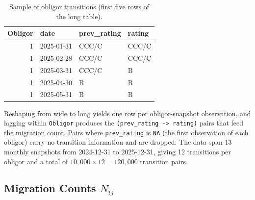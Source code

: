 \documentclass[
  11pt,
]{article}
\newenvironment{Shaded}{\begin{snugshade}}{\end{snugshade}}
\newcommand{\AttributeTok}[1]{\textcolor[rgb]{0.13,0.29,0.53}{#1}}
\newcommand{\FunctionTok}[1]{\textcolor[rgb]{0.13,0.29,0.53}{\textbf{#1}}}
\newcommand{\NormalTok}[1]{#1}
\newcommand{\OtherTok}[1]{\textcolor[rgb]{0.56,0.35,0.01}{#1}}
\newcommand{\SpecialCharTok}[1]{\textcolor[rgb]{0.81,0.36,0.00}{\textbf{#1}}}
\newcommand{\StringTok}[1]{\textcolor[rgb]{0.31,0.60,0.02}{#1}}
\begin{document}
\begin{longtable}[t]{rlll}
\caption{\label{tab:task1-preview}Sample of obligor transitions (first five rows of the long table).}\\
\toprule
Obligor & date & prev\_rating & rating\\
\midrule
1 & 2025-01-31 & CCC/C & CCC/C\\
1 & 2025-02-28 & CCC/C & CCC/C\\
1 & 2025-03-31 & CCC/C & B\\
1 & 2025-04-30 & B & B\\
1 & 2025-05-31 & B & B\\
\bottomrule
\end{longtable}

Reshaping from wide to long yields one row per obligor-snapshot
observation, and lagging within \texttt{Obligor} produces the
\texttt{(prev\_rating\ -\textgreater{}\ rating)} pairs that feed the
migration count. Pairs where \texttt{prev\_rating} is \texttt{NA} (the
first observation of each obligor) carry no transition information and
are dropped. The data span 13 monthly snapshots from 2024-12-31 to
2025-12-31, giving 12 transitions per obligor and a total of
\(10{,}000 \times 12 = 120{,}000\) transition pairs.

\subsection{\texorpdfstring{Migration Counts
\(N_{ij}\)}{Migration Counts N\_\{ij\}}}\label{migration-counts-n_ij}

\begin{Shaded}
\end{Shaded}
\end{document}
